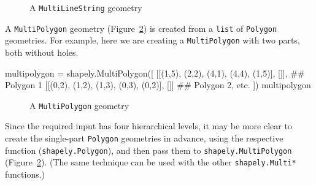 \documentclass[
  letterpaper,
]{krantz}
\newenvironment{Shaded}{\begin{snugshade}}{\end{snugshade}}
\newcommand{\CommentTok}[1]{\textcolor[rgb]{0.37,0.37,0.37}{#1}}
\newcommand{\DecValTok}[1]{\textcolor[rgb]{0.68,0.00,0.00}{#1}}
\newcommand{\NormalTok}[1]{\textcolor[rgb]{0.00,0.23,0.31}{#1}}
\newcommand{\OperatorTok}[1]{\textcolor[rgb]{0.37,0.37,0.37}{#1}}
\begin{document}
\begin{figure}[H]


\caption{\label{fig-multilinestring}A \texttt{MultiLineString} geometry}

\end{figure}%

A \texttt{\textquotesingle{}MultiPolygon\textquotesingle{}} geometry
(Figure~\ref{fig-multipolygon1}) is created from a \texttt{list} of
\texttt{Polygon} geometries. For example, here we are creating a
\texttt{\textquotesingle{}MultiPolygon\textquotesingle{}} with two
parts, both without holes.

\begin{Shaded}
\begin{Highlighting}[]
\NormalTok{multipolygon }\OperatorTok{=}\NormalTok{ shapely.MultiPolygon([}
\NormalTok{    [[(}\DecValTok{1}\NormalTok{,}\DecValTok{5}\NormalTok{), (}\DecValTok{2}\NormalTok{,}\DecValTok{2}\NormalTok{), (}\DecValTok{4}\NormalTok{,}\DecValTok{1}\NormalTok{), (}\DecValTok{4}\NormalTok{,}\DecValTok{4}\NormalTok{), (}\DecValTok{1}\NormalTok{,}\DecValTok{5}\NormalTok{)], []],  }\CommentTok{\#\# Polygon 1 }
\NormalTok{    [[(}\DecValTok{0}\NormalTok{,}\DecValTok{2}\NormalTok{), (}\DecValTok{1}\NormalTok{,}\DecValTok{2}\NormalTok{), (}\DecValTok{1}\NormalTok{,}\DecValTok{3}\NormalTok{), (}\DecValTok{0}\NormalTok{,}\DecValTok{3}\NormalTok{), (}\DecValTok{0}\NormalTok{,}\DecValTok{2}\NormalTok{)], []]   }\CommentTok{\#\# Polygon 2, etc.}
\NormalTok{])}
\NormalTok{multipolygon}
\end{Highlighting}
\end{Shaded}

\begin{figure}[H]


\caption{\label{fig-multipolygon1}A \texttt{MultiPolygon} geometry}

\end{figure}%

Since the required input has four hierarchical levels, it may be more
clear to create the single-part
\texttt{\textquotesingle{}Polygon\textquotesingle{}} geometries in
advance, using the respective function (\texttt{shapely.Polygon}), and
then pass them to \texttt{shapely.MultiPolygon}
(Figure~\ref{fig-multipolygon1}). (The same technique can be used with
the other \texttt{shapely.Multi*} functions.)
\end{document}
